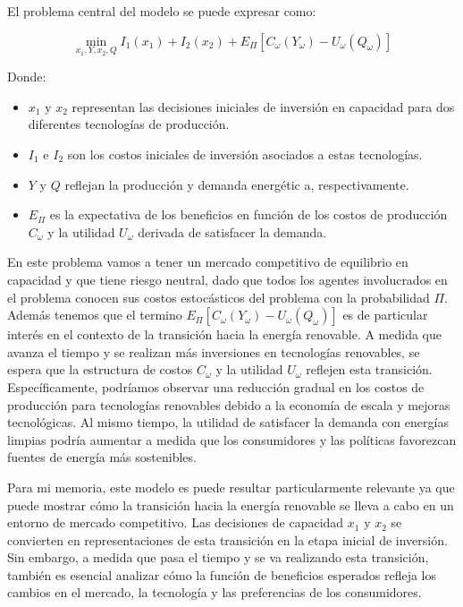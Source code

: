 \vspace{2.5mm}
El problema central del modelo se puede expresar como:

\begin{equation}
\min_{x_1, Y, x_2, Q} I_1(x_1) + I_2(x_2) + E_\Pi[C_\omega(Y_\omega) - U_\omega(Q_\omega)]
\end{equation}

Donde:
\begin{itemize}
    \item \(x_1\) y \(x_2\) representan las decisiones iniciales de inversión en capacidad para dos diferentes tecnologías de producción.
    \item \(I_1\) e \(I_2\) son los costos iniciales de inversión asociados a estas tecnologías.
    \item \(Y\) y \(Q\) reflejan la producción y demanda energétic
    a, respectivamente.
    \item \(E_\Pi\) es la expectativa de los beneficios en función de los costos de producción \(C_\omega\) y la utilidad \(U_\omega\) derivada de satisfacer la demanda.
\end{itemize}


\vspace{2.5mm}
En este problema vamos a tener un mercado competitivo de equilibrio en capacidad y que tiene riesgo neutral, dado que todos los agentes involucrados en el problema conocen sus costos estocásticos del problema con la probabilidad $\Pi$. Además tenemos que el termino \( E_\Pi[C_\omega(Y_\omega) - U_\omega(Q_\omega)] \) es de particular interés en el contexto de la transición hacia la energía renovable. A medida que avanza el tiempo y se realizan más inversiones en tecnologías renovables, se espera que la estructura de costos \(C_\omega\) y la utilidad \(U_\omega\) reflejen esta transición. Específicamente, podríamos observar una reducción gradual en los costos de producción para tecnologías renovables debido a la economía de escala y mejoras tecnológicas. Al mismo tiempo, la utilidad de satisfacer la demanda con energías limpias podría aumentar a medida que los consumidores y las políticas favorezcan fuentes de energía más sostenibles.


\vspace{2.5mm}
Para mi memoria, este modelo es 
 puede resultar particularmente relevante ya que puede mostrar cómo la transición hacia la energía renovable se lleva a cabo en un entorno de mercado competitivo. Las decisiones de capacidad \(x_1\) y \(x_2\) se convierten en representaciones de esta transición en la etapa inicial de inversión. Sin embargo, a medida que pasa el tiempo y se va realizando esta transición, también es esencial analizar cómo la función de beneficios esperados refleja los cambios en el mercado, la tecnología y las preferencias de los consumidores.



